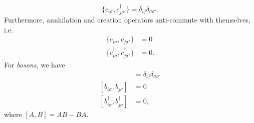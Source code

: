 \documentclass{article}
\numberwithin{equation}{section}
\begin{document}
\begin{equation}
    \{c_{i\sigma},c^\dagger_{j\sigma'}\} = \delta_{ij}\delta_{\sigma\sigma'}.
\end{equation}
Furthermore, annhilation and creation operators anti-commute with themselves, i.e. 
\begin{align}
    \{c_{i\sigma}, c_{j\sigma'}\} &= 0 \\
    \{c^\dagger_{i\sigma}, c^\dagger_{j\sigma'}\} &= 0.
\end{align}
For \textit{bosons,} we have 
\begin{align}
    [b_{i\sigma},b_{j\sigma}^\dagger] &= \delta_{ij}\delta_{\sigma\sigma'} \\
    [b_{i\sigma},b_{j\sigma}] &= 0 \\
    [b_{i\sigma}^\dagger,b_{j\sigma}^\dagger] &= 0,
\end{align}
where $[A,B]=AB-BA.$
\end{document}
